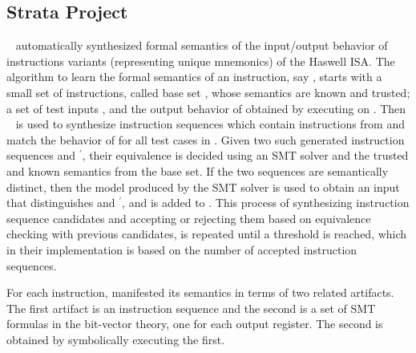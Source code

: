 \subsection{Strata Project}\label{sec:prelimstrata}
\Strata~\cite{Heule2016a} automatically synthesized formal semantics of the
input/output behavior of \strataWithDupIS{} instructions variants (representing \strataIntel{} unique mnemonics) of the \ISA Haswell ISA. 
The algorithm to learn the formal semantics of an instruction, say , starts with a small set of instructions, called base set , whose semantics are known and trusted; a set of test inputs , and the output behavior of  obtained by executing  on . Then \Stoke~\cite{Stoke2013} is used  to synthesize  instruction sequences which contain instructions from  and match the behavior of  for all test cases in . Given two such generated instruction sequences  and $^\prime$, their equivalence is decided  using an SMT solver and the trusted and known  semantics from the base set. If the two sequences are
semantically distinct, then the model produced by the SMT solver is used  to obtain
an input  that distinguishes  and $^\prime$, and  is added to . This process of synthesizing instruction sequence candidates and accepting or rejecting them based on equivalence checking with previous candidates, is repeated until a threshold is reached, which in their implementation is based on the number of accepted instruction sequences. 


For each instruction, \Strata manifested its semantics in terms of two related artifacts.
The first artifact is an instruction sequence and the second is a set of SMT formulas 
in the bit-vector theory, one for each output register. 
The second is obtained by symbolically executing the first.

